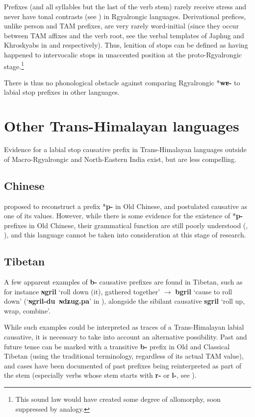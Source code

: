 \documentclass[oneside,a4paper,11pt]{article}
\newcommand{\ipa}[1]{\textbf{{\phon\mbox{#1}}}} %
\newcommand{\forme}[2]{\ipa{#1} `#2'}
\begin{document}
Prefixes (and all syllables but the last of the verb stem) rarely receive stress and never have tonal contrasts (see \citealt{jackson05yingao}) in Rgyalrongic languages. Derivational prefices, unlike person and TAM prefixes, are very rarely word-initial (since they occur between TAM affixes and the verb root, see the verbal templates of Japhug and Khroskyabs in \citealt{jacques13harmonization} and \citealt{lai15person} respectively). Thus, lenition of stops can be defined as having happened to intervocalic stops in unaccented position at the proto-Rgyalrongic stage.\footnote{This sound law would have created some degree of allomorphy, soon suppressed by analogy.}

There is thus no phonological obstacle against comparing Rgyalrongic *\ipa{wɐ-} to labial stop prefixes in other languages.

 \section{Other Trans-Himalayan languages} 
Evidence for a labial stop causative  prefix in Trans-Himalayan languages outside of Macro-Rgyalrongic and North-Eastern India exist, but are less compelling.

\subsection{Chinese}
 \citet[593]{maspero52} proposed to reconstruct a prefix *\ipa{p-} in Old Chinese, and postulated causative as one of its values. However,  while there is some evidence for the existence of *\ipa{p-} prefixes in Old Chinese, their grammatical function are still poorly understood (\citealt[87-9]{sagart99roc}, \citealt{behr10ocp}), and this language cannot be taken into consideration at this stage of research.
 
\subsection{Tibetan}
A few apparent examples of \ipa{b-} causative prefixes are found in Tibetan, such as for instance \forme{ɴgril}{roll down (it), gathered together} $\rightarrow$ \forme{bgril}{cause to roll down} (`\ipa{ɴgril-du ɴdʑug.pa}' in \citealt{bodrgya}), alongside the sibilant causative \forme{sgril}{roll up, wrap, combine}.

While such examples could be interpreted as traces of a Trans-Himalayan labial causative, it is necessary to take into account an alternative possibility. Past and future tense can be marked with a transitive \ipa{b-} prefix in Old and Classical Tibetan (using the traditional terminology, regardless of its actual TAM value), and cases have been documented of past prefixes being reinterpreted as part of the stem (especially verbs whose stem starts with \ipa{r-} or \ipa{l-}, see  \citet{hill05vbri, jacques10ndr, hill15lan}).
\end{document}
